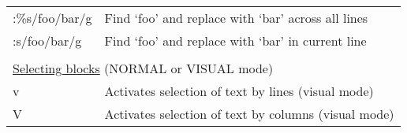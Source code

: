 \documentclass[11pt,a4paper,oneside]{article}
\begin{document}
\begin{table}
\begin{tabular}{p{5.5cm} l}
:\%s/foo/bar/g & Find `foo' and replace with `bar' across all lines \\
:s/foo/bar/g & Find `foo' and replace with `bar' in current line \\
 & \\[-1.5ex]
\multicolumn{2}{l}{\underline{Selecting blocks} (NORMAL or VISUAL mode)} \\
v & Activates selection of text by lines (visual mode) \\
V & Activates selection of text by columns (visual mode) \\

\end{tabular}

\end{table}
\end{document}
